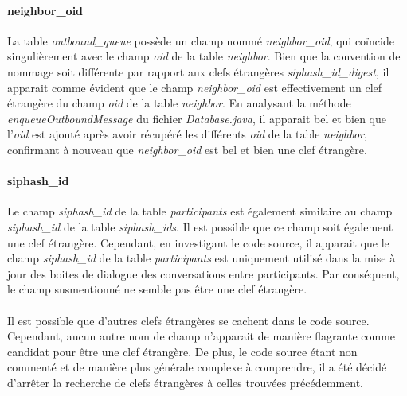 \documentclass[french]{report}
\begin{document}
	\paragraph{neighbor\_oid}{La table \textit{outbound\_queue} possède un champ nommé \textit{neighbor\_oid}, qui coïncide singulièrement avec le champ \textit{oid} de la table \textit{neighbor}. Bien que la convention de nommage soit différente par rapport aux clefs étrangères \textit{siphash\_id\_digest}, il apparait comme évident que le champ \textit{neighbor\_oid} est effectivement un clef étrangère du champ \textit{oid} de la table \textit{neighbor}. En analysant la méthode \textit{enqueueOutboundMessage} du fichier \textit{Database.java}, il apparait bel et bien que l'\textit{oid} est ajouté après avoir récupéré les différents \textit{oid} de la table \textit{neighbor}, confirmant à nouveau que \textit{neighbor\_oid} est bel et bien une clef étrangère.}
	\paragraph{siphash\_id}{Le champ \textit{siphash\_id} de la table \textit{participants} est également similaire au champ \textit{siphash\_id} de la table \textit{siphash\_ids}. Il est possible que ce champ soit également une clef étrangère. Cependant, en investigant le code source, il apparait que le champ \textit{siphash\_id} de la table \textit{participants} est uniquement utilisé dans la mise à jour des boites de dialogue des conversations entre participants. Par conséquent, le champ susmentionné ne semble pas être une clef étrangère.}
	
	
	\paragraph{}{Il est possible que d'autres clefs étrangères se cachent dans le code source. Cependant, aucun autre nom de champ n'apparait de manière flagrante comme candidat pour être une clef étrangère. De plus, le code source étant non commenté et de manière plus générale complexe à comprendre, il a été décidé d'arrêter la recherche de clefs étrangères à celles trouvées précédemment.}
	
	
\end{document}
